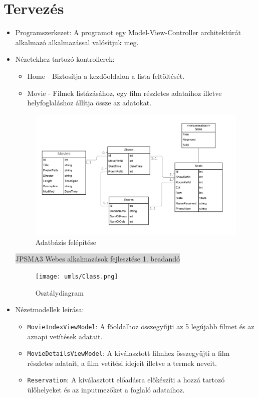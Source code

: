\documentclass[11pt,a4paper]{article}
\begin{document}
\section{Tervezés}
\begin{itemize}
	\item Programszerkezet: A programot egy Model-View-Controller architektúrát
	alkalmazó alkalmazással valósítjuk meg.
	\item Nézetekhez tartozó kontrollerek:
	\begin{itemize}
		\item Home - Biztosítja a kezdőoldalon a lista feltöltését.
		\item Movie - Filmek listázásához, egy film részletes adataihoz illetve
		helyfoglaláshoz állítja össze az adatokat.
	\end{itemize}
	\begin{figure}[h]
		\centering
		\includegraphics[width=13cm]{umls/Entity.png}
		\caption{Adatbázis felépítése}
	\end{figure}
	\newpage
	\thispagestyle{empty}
	\begin{center}
	\colorbox{lightgray}{{\large JPSMA3} \hspace{3cm} {\large Webes alkalmazások fejlesztése 1. beadandó} \hspace{5cm} \thepage}
	\end{center}
	\begin{figure}[h]
	\centering
	\texttt{[image: umls/Class.png]}
	\caption{Osztálydiagram}
	\end{figure}
	\item Nézetmodellek leírása:
	\begin{itemize}
		\item\verb|MovieIndexViewModel|: A főoldalhoz összegyűjti az 5 legújabb
		filmet és az aznapi vetítések adatait.
		\item\verb|MovieDetailsViewModel|: A kiválasztott filmhez összegyűjti a
		film részletes adatait, a film vetítési idejeit illetve a termek neveit.
		\item\verb|Reservation|: A kiválasztott előadásra előkészíti a hozzá
		tartozó ülőhelyeket és az inputmezőket a foglaló adataihoz.
	\end{itemize}
\end{itemize}
\end{document}
